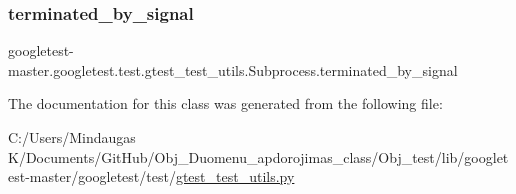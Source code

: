 \subsubsection{\texorpdfstring{terminated\_by\_signal}{terminated\_by\_signal}}
{\footnotesize\ttfamily googletest-\/master.\+googletest.\+test.\+gtest\+\_\+test\+\_\+utils.\+Subprocess.\+terminated\+\_\+by\+\_\+signal}



The documentation for this class was generated from the following file\+:\begin{DoxyCompactItemize}
\item 
C\+:/\+Users/\+Mindaugas K/\+Documents/\+Git\+Hub/\+Obj\+\_\+\+Duomenu\+\_\+apdorojimas\+\_\+class/\+Obj\+\_\+test/lib/googletest-\/master/googletest/test/\mbox{\hyperlink{_obj__test_2lib_2googletest-master_2googletest_2test_2gtest__test__utils_8py}{gtest\+\_\+test\+\_\+utils.\+py}}\end{DoxyCompactItemize}

